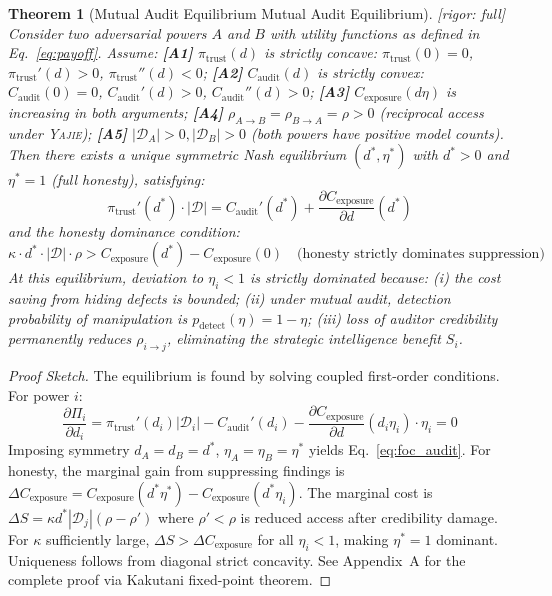 \documentclass[11pt,a4paper]{article}
\newtheorem{theorem}{Theorem}[section]
\theoremstyle{definition}
\theoremstyle{remark}
\newcommand{\rigorFull}{\textcolor{green!60!black}{[rigor: full]}}
\newcommand{\assumptionTag}[1]{\textsf{\textbf{[A#1]}}}
\newcommand{\Yajie}{\textsc{Yajie}}
\newcommand{\cD}{\mathcal{D}}
\newcommand{\trustPremium}{\pi_{\text{trust}}}
\begin{document}
\begin{theorem}[Mutual Audit Equilibrium Mutual Audit Equilibrium] \label{thm:mutual_audit}
\rigorFull
Consider two adversarial powers $A$ and $B$ with utility functions as defined in Eq.~\eqref{eq:payoff}. Assume:
\assumptionTag{1} $\trustPremium(d)$ is strictly concave: $\trustPremium(0) = 0$, $\trustPremium'(d) > 0$, $\trustPremium''(d) < 0$;
\assumptionTag{2} $C_{\text{audit}}(d)$ is strictly convex: $C_{\text{audit}}(0) = 0$, $C_{\text{audit}}'(d) > 0$, $C_{\text{audit}}''(d) > 0$;
\assumptionTag{3} $C_{\text{exposure}}(d \eta)$ is increasing in both arguments;
\assumptionTag{4} $\rho_{A \to B} = \rho_{B \to A} = \rho > 0$ (reciprocal access under \Yajie{});
\assumptionTag{5} $|\cD_A| > 0, |\cD_B| > 0$ (both powers have positive model counts).
Then there exists a unique symmetric Nash equilibrium $(d^*, \eta^*)$ with $d^* > 0$ and $\eta^* = 1$ (full honesty), satisfying:
\begin{equation}
    \trustPremium'(d^*) \cdot |\cD| = C_{\text{audit}}'(d^*) + \frac{\partial C_{\text{exposure}}}{\partial d}(d^*)
    \label{eq:foc_audit}
\end{equation}
and the honesty dominance condition:
\begin{equation}
    \kappa \cdot d^* \cdot |\cD| \cdot \rho > C_{\text{exposure}}(d^*) - C_{\text{exposure}}(0) \quad \text{(honesty strictly dominates suppression)}
    \label{eq:honesty_dominance}
\end{equation}
At this equilibrium, deviation to $\eta_i < 1$ is strictly dominated because: (i) the cost saving from hiding defects is bounded; (ii) under mutual audit, detection probability of manipulation is $p_{\text{detect}}(\eta) = 1 - \eta$; (iii) loss of auditor credibility permanently reduces $\rho_{i \to j}$, eliminating the strategic intelligence benefit $S_i$.
\end{theorem}
\begin{proof}[Proof Sketch]
The equilibrium is found by solving coupled first-order conditions. For power $i$:
\begin{equation}
    \frac{\partial \Pi_i}{\partial d_i} = \trustPremium'(d_i)|\cD_i| - C_{\text{audit}}'(d_i) - \frac{\partial C_{\text{exposure}}}{\partial d}(d_i\eta_i) \cdot \eta_i = 0
\end{equation}
Imposing symmetry $d_A = d_B = d^*$, $\eta_A = \eta_B = \eta^*$ yields Eq.~\eqref{eq:foc_audit}. For honesty, the marginal gain from suppressing findings is $\Delta C_{\text{exposure}} = C_{\text{exposure}}(d^*\eta^*) - C_{\text{exposure}}(d^*\eta_i)$. The marginal cost is $\Delta S = \kappa d^* |\cD_j| (\rho - \rho')$ where $\rho' < \rho$ is reduced access after credibility damage. For $\kappa$ sufficiently large, $\Delta S > \Delta C_{\text{exposure}}$ for all $\eta_i < 1$, making $\eta^* = 1$ dominant. Uniqueness follows from diagonal strict concavity. See Appendix~A for the complete proof via Kakutani fixed-point theorem.
\end{proof}
\end{document}
